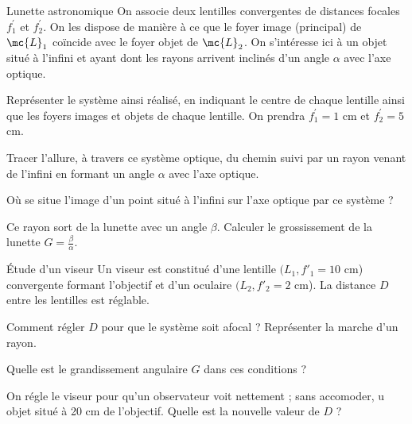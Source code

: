 \begin{exo}[PCSI][1][colle]{Lunette astronomique}
On associe deux lentilles convergentes de distances focales $f^{'}_1$ et $f^{'}_2$.
On les dispose de manière à ce que le foyer image (principal) de $\mc{L}_1$  coïncide avec le foyer objet de $\mc{L}_2$.
On s'intéresse ici à un objet situé à l'infini et ayant dont les rayons arrivent inclinés d'un angle $\alpha$ avec l'axe optique.
\begin{quest}
\item Représenter le système ainsi réalisé, en indiquant le centre de chaque lentille ainsi que les foyers images et objets de chaque lentille. On prendra $f^{'}_1= 1$ cm et $f^{'}_2=5$ cm.
\item Tracer l'allure, à travers ce système optique, du chemin suivi par un rayon venant de l'infini en formant un angle $\alpha$ avec l'axe optique.
\item Où se situe l'image d'un point situé à l'infini sur l'axe optique par ce système ?
\item Ce rayon sort de la lunette avec un angle $\beta$. Calculer le grossissement de la lunette $G=\frac{\beta}{\alpha}$.
\end{quest}
\end{exo}


\begin{exo}[PCSI]{\'Etude d'un viseur}
Un viseur est constitué d'une lentille $(L_{1},f'_{1}=10$ cm) convergente formant l'objectif et d'un oculaire $(L_{2},f'_{2}=2$ cm). La distance $D$ entre les lentilles
est réglable.

\begin{quest}
 \item Comment régler $D$ pour que le système soit afocal ? Représenter la marche d'un rayon.
 \item Quelle est le grandissement angulaire $G$ dans ces conditions ?
 \item On régle le viseur pour qu'un observateur voit nettement ; sans accomoder, u objet situé à 20 cm de l'objectif. Quelle est la nouvelle valeur de $D$ ?
\end{quest}
\end{exo}

